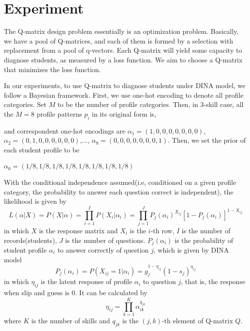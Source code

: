 \documentclass{edm_template}
\newcommand{\Michel}[1]{{\textcolor{red}{[#1]}}}
\begin{document}
\section{Experiment}
The Q-matrix design problem essentially is an optimization problem. Basically, we have a pool of Q-matrices, and each of them is formed by a selection with replacement from a pool of q-vectors. Each Q-matrix will yield some capacity to diagnose students, as measured by a loss function. We aim to choose a Q-matrix that minimizes the loss function.

In our experiments, to use Q-matrix to diagnose students under DINA model, we follow a Bayesian framework. First, we use one-hot encoding to denote all profile categories. Set $M$ to be the number of profile categories. Then, in 3-skill case, all the $M=8$ profile patterns $p_i$ in its original form is,

and correspondent one-hot encodings are $\alpha_1=(1,0,0,0,0,0,0,0)$, $\alpha_2=(0,1,0,0,0,0,0,0)$,...,
$\alpha_8=(0,0,0,0,0,0,0,1)$.
Then, we set the prior of each student profile to be 

$\alpha_0=(1/8,1/8,1/8,1/8,1/8,1/8,1/8,1/8)$ 

With the conditional independence assumed(i.e, conditioned on a given profile category, the probability to answer each question correct is independent), the likelihood is given by \cite{de2009dina}
$$ L(\alpha|X) = P(X|\alpha) = \prod_{i=1}^I P(X_i|\alpha_i) = \prod_{j=1}^J P_j(\alpha_i)^{X_{ij}}[1-P_j(\alpha_i)]^{1-X_{ij}}$$
in which $X$ is the response matrix and $X_i$ is the $i$-th row, $I$ is the number of records(students), $J$ is the  number of questions. $P_j(\alpha_i)$ is the probability of student profile $\alpha_i$ to answer correctly of question $j$, which is given by DINA model
$$ P_j(\alpha_i) = P(X_{ij}=1|\alpha_i)=g_j^{1-\eta_{ij}}(1-s_j)^{\eta_{ij}}$$
in which $\eta_{ij}$ is the latent response of profile $\alpha_i$ to question $j$, that is, the response when slip and guess is 0. It can be calculated by 
$$\eta_{ij} = \prod_{k=1}^K \alpha_{ik}^{q_{jk}}$$
where $K$ is the number of skills and $q_{jk}$ is the $(j,k)$-th element of Q-matrix $Q$.
\end{document}
